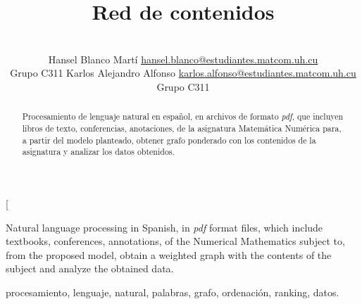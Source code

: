 \documentclass[a4paper,10pt,twocolumn]{article}
\title{Red de contenidos}
\author{\\
\name Hansel Blanco Martí \email \href{mailto:hansel.blanco@estudiantes.matcom.uh.cu}{hansel.blanco@estudiantes.matcom.uh.cu}
	\\ \addr Grupo C311 \AND
\name Karlos Alejandro Alfonso \email \href{mailto:karlos.alfonso@estudiantes.matcom.uh.cu}{karlos.alfonso@estudiantes.matcom.uh.cu}
  \\ \addr Grupo C311}
\begin{document}
\twocolumn[

\maketitle


\begin{abstract}

	Procesamiento de lenguaje natural en español, en archivos de formato \emph{pdf}, que incluyen libros de texto, conferencias, anotaciones, de la asignatura Matemática Numérica para, a partir del modelo planteado, obtener grafo ponderado con los contenidos de la asignatura y analizar los datos obtenidos.

\end{abstract}

\vspace{0.5cm}

\begin{enabstract}

  Natural language processing in Spanish, in \emph{pdf} format files, which include textbooks, conferences, annotations, of the Numerical Mathematics subject to, from the proposed model, obtain a weighted graph with the contents of the subject and analyze the obtained data.

\end{enabstract}

\begin{keywords}
	procesamiento,
	lenguaje,
	natural,
        palabras,
        grafo,
        ordenación,
        ranking,
        datos.
\end{keywords}
\end{document}
